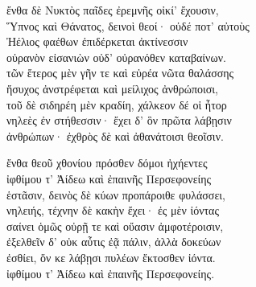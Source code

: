 \quad{}ἔνθα δὲ Νυκτὸς παῖδες ἐρεμνῆς οἰκί' ἔχουσιν,\\
Ὕπνος καὶ Θάνατος, δεινοὶ θεοί· οὐδέ ποτ' αὐτοὺς \\
Ἠέλιος φαέθων ἐπιδέρκεται ἀκτίνεσσιν \\
οὐρανὸν εἰσανιὼν οὐδ' οὐρανόθεν καταβαίνων. \\
τῶν ἕτερος μὲν γῆν τε καὶ εὐρέα νῶτα θαλάσσης \\
ἥσυχος ἀνστρέφεται καὶ μείλιχος ἀνθρώποισι,\\
τοῦ δὲ σιδηρέη μὲν κραδίη, χάλκεον δέ οἱ ἦτορ\\
νηλεὲς ἐν στήθεσσιν· ἔχει δ' ὃν πρῶτα λάβῃσιν  \\
ἀνθρώπων· ἐχθρὸς δὲ καὶ ἀθανάτοισι θεοῖσιν. 

\quad{}ἔνθα θεοῦ χθονίου πρόσθεν δόμοι ἠχήεντες\\
ἰφθίμου τ' Ἀίδεω καὶ ἐπαινῆς Περσεφονείης\\
ἑστᾶσιν, δεινὸς δὲ κύων προπάροιθε φυλάσσει, \\
νηλειής, τέχνην δὲ κακὴν ἔχει· ἐς μὲν ἰόντας  \\
σαίνει ὁμῶς οὐρῇ τε καὶ οὔασιν ἀμφοτέροισιν,\\
ἐξελθεῖν δ' οὐκ αὖτις ἐᾷ πάλιν, ἀλλὰ δοκεύων\\
ἐσθίει, ὅν κε λάβῃσι πυλέων ἔκτοσθεν ἰόντα.\\
ἰφθίμου τ' Ἀίδεω καὶ ἐπαινῆς Περσεφονείης.

